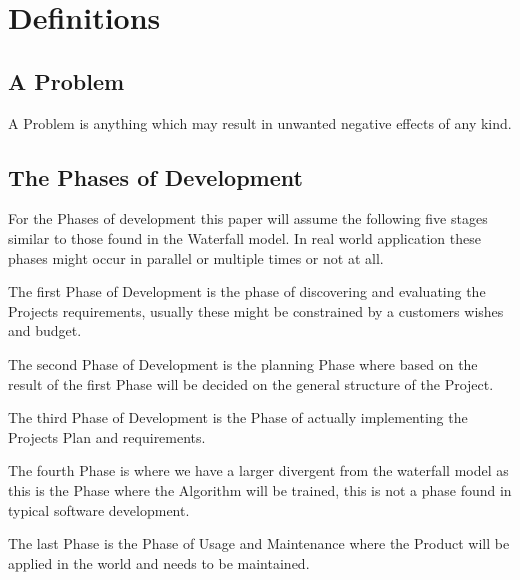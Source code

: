 \section{Definitions}

\subsection{A Problem}
A Problem is anything which may result in unwanted negative effects of any kind.

\subsection{The Phases of Development}
For the Phases of development this paper will assume the following five stages similar to those found in the Waterfall model.
In real world application these phases might occur in parallel or multiple times or not at all.

The first Phase of Development is the phase of discovering and evaluating the Projects requirements, usually these might be constrained by a customers wishes and budget.

The second Phase of Development is the planning Phase where based on the result of the first Phase will be decided on the general structure of the Project.

The third Phase of Development is the Phase of actually implementing the Projects Plan and requirements.

The fourth Phase is where we have a larger divergent from the waterfall model as this is the Phase where the Algorithm will be trained, this is not a phase found in typical software development.

The last Phase is the Phase of Usage and Maintenance where the Product will be applied in the world and needs to be maintained.